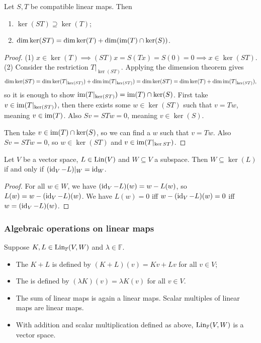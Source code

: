 \begin{proposition} \label{kernelCompositionLinearMaps}
Let $S,T$ be compatible linear maps. Then
\begin{enumerate}
\item $\ker(ST)\supseteq \ker(T)$;
\item $\dim\ker(ST) = \dim\ker(T) + \dim(\operatorname{im}(T)\cap\ker(S))$.
\end{enumerate}
\end{proposition}
\begin{proof}
(1) $x\in\ker(T) \implies (ST)x = S(Tx) = S(0) = 0 \implies x\in\ker(ST)$.
(2) Consider the restriction $T|_{\ker(ST)}$. Applying the dimension theorem gives
\[ \dim\ker(ST) = \dim\ker(T|_{\ker(ST)}) + \dim\operatorname{im}(T|_{\ker(ST)}) = \dim\ker(ST) = \dim\ker(T) + \dim\operatorname{im}(T|_{\ker(ST)}) , \]
so it is enough to show $\operatorname{im}(T|_{\ker(ST)}) = \operatorname{im}(T)\cap\ker(S)$. First take $v\in\operatorname{im}(T|_{\ker(ST)})$, then there exists some $w\in\ker(ST)$ such that $v=Tw$, meaning $v\in\operatorname{im}(T)$. Also $Sv = STw = 0$, meaning $v\in\ker(S)$.

Then take $v\in\operatorname{im}(T)\cap\ker(S)$, so we can find a $w$ such that $v = Tw$. Also $Sv = STw = 0$, so $w\in\ker(ST)$ and $v\in\operatorname{im}(T|_{\ker{ST}})$.
\end{proof}

\begin{lemma} \label{complementMapIdentityLemma}
Let $V$ be a vector space, $L\in \operatorname{Lin}(V)$ and $W\subseteq V$ a subspace. Then $W \subseteq \ker(L)$ \textup{if and only if} $(\operatorname{id}_V - L)|_W = \operatorname{id}_W$.
\end{lemma}
\begin{proof}
For all $w\in W$, we have $(\operatorname{id}_V - L)(w) = w - L(w)$, so $L(w) = w - (\operatorname{id}_V - L)(w)$. We have $L(w) = 0$ iff $w - (\operatorname{id}_V - L)(w) = 0$ iff $w = (\operatorname{id}_V - L)(w)$.
\end{proof}

\subsubsection{Algebraic operations on linear maps}
\begin{definition}
Suppose $K,L \in \operatorname{Lin}_{\mathbb{F}}(V,W)$ and $\lambda \in \mathbb{F}$.
\begin{itemize}
\item The  $K+L$ is defined by $(K+L)(v) = Kv+Lv$ for all $v\in V$;
\item The  is defined by $(\lambda K)(v) = \lambda K(v)$ for all $v\in V$.
\end{itemize}
\end{definition}
\begin{proposition} \label{linearMapsVectorSpace}
\begin{itemize}
\item The sum of linear maps is again a linear maps. Scalar multiples of linear maps are linear maps.
\item With addition and scalar multiplication defined as above, $\operatorname{Lin}_\mathbb{F}(V,W)$ is a vector space.
\end{itemize}
\end{proposition}

